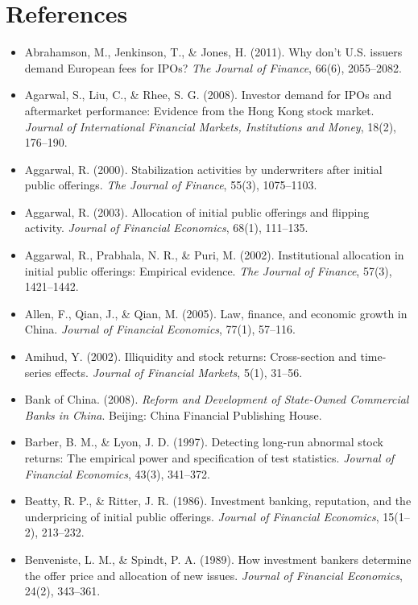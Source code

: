 \documentclass[11pt,letterpaper]{article}
\begin{document}
\section*{\texorpdfstring{References}{References}}
\begin{itemize}
\item Abrahamson, M., Jenkinson, T., \& Jones, H. (2011). Why don't U.S. issuers demand European fees for IPOs? \textit{The Journal of Finance}, 66(6), 2055–2082.
\item Agarwal, S., Liu, C., \& Rhee, S. G. (2008). Investor demand for IPOs and aftermarket performance: Evidence from the Hong Kong stock market. \textit{Journal of International Financial Markets, Institutions and Money}, 18(2), 176–190.
\item Aggarwal, R. (2000). Stabilization activities by underwriters after initial public offerings. \textit{The Journal of Finance}, 55(3), 1075–1103.
\item Aggarwal, R. (2003). Allocation of initial public offerings and flipping activity. \textit{Journal of Financial Economics}, 68(1), 111–135.
\item Aggarwal, R., Prabhala, N. R., \& Puri, M. (2002). Institutional allocation in initial public offerings: Empirical evidence. \textit{The Journal of Finance}, 57(3), 1421–1442.
\item Allen, F., Qian, J., \& Qian, M. (2005). Law, finance, and economic growth in China. \textit{Journal of Financial Economics}, 77(1), 57–116.
\item Amihud, Y. (2002). Illiquidity and stock returns: Cross-section and time-series effects. \textit{Journal of Financial Markets}, 5(1), 31–56.
\item Bank of China. (2008). \textit{Reform and Development of State-Owned Commercial Banks in China}. Beijing: China Financial Publishing House.
\item Barber, B. M., \& Lyon, J. D. (1997). Detecting long-run abnormal stock returns: The empirical power and specification of test statistics. \textit{Journal of Financial Economics}, 43(3), 341–372.
\item Beatty, R. P., \& Ritter, J. R. (1986). Investment banking, reputation, and the underpricing of initial public offerings. \textit{Journal of Financial Economics}, 15(1–2), 213–232.
\item Benveniste, L. M., \& Spindt, P. A. (1989). How investment bankers determine the offer price and allocation of new issues. \textit{Journal of Financial Economics}, 24(2), 343–361.

\end{itemize}
\end{document}
